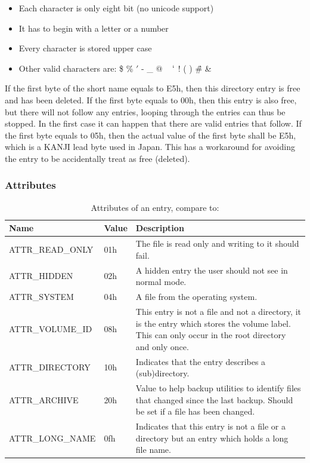 \begin{itemize}
\item Each character is only eight bit (no unicode support)
\item It has to begin with a letter or a number
\item Every character is stored upper case
\item Other valid characters are: \$ \% $'$ -  \_ @ ~ $`$ ! ( ) { } \^ \# \&
\end{itemize}

If the first byte of the short name equals to E5h, then this directory entry is free and has been deleted. If the first byte equals to 00h, then this entry is also free, but there will not follow any entries, looping through the entries can thus be stopped. In the first case it can happen that there are valid entries that follow. If the first byte equals to 05h, then the actual value of the first byte shall be E5h, which is a KANJI lead byte used in Japan. This has a workaround for avoiding the entry to be accidentally treat as free (deleted).

\subsubsection{Attributes}

\begin{table}[!ht]
\caption{Attributes of an entry, compare to: \cite{usb_ms_jan, fatgen103}}
\centering
\begin{tabular}{|l|l|p{9cm}|}
\hline\hline
\textbf{Name} & \textbf{Value}  & \textbf{Description}\\ \hline
ATTR\_READ\_ONLY & 01h & The file is read only and writing to it should fail. \\ \hline
ATTR\_HIDDEN & 02h & A hidden entry the user should not see in normal mode. \\ \hline
ATTR\_SYSTEM & 04h & A file from the operating system. \\ \hline
ATTR\_VOLUME\_ID & 08h & This entry is not a file and not a directory, it is the entry which stores the volume label. This can only occur in the root directory and only once. \\ \hline
ATTR\_DIRECTORY & 10h & Indicates that the entry describes a (sub)directory. \\ \hline
ATTR\_ARCHIVE & 20h & Value to help backup utilities to identify files that changed since the last backup. Should be set if a file has been changed. \\ \hline
ATTR\_LONG\_NAME & 0fh & Indicates that this entry is not a file or a directory but an entry which holds a long file name. \\ \hline
\end{tabular}
\label{table:fat_dir_entry_attr}
\end{table}

